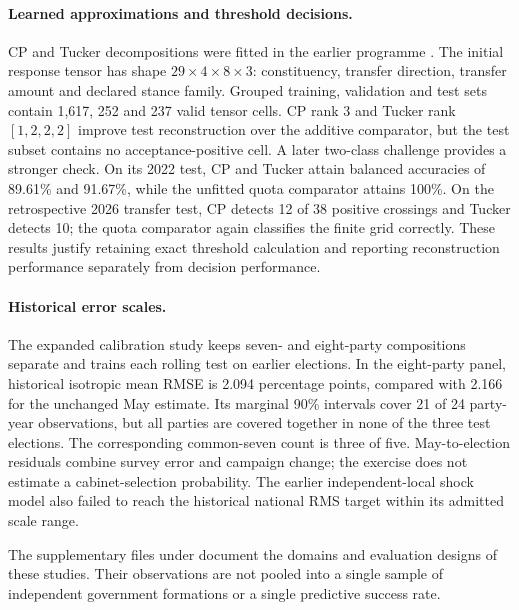\paragraph{Learned approximations and threshold decisions.}
CP and Tucker decompositions were fitted in the earlier programme \citep{kolda2009}. The initial response tensor has shape \(29\times4\times8\times3\): constituency, transfer direction, transfer amount and declared stance family. Grouped training, validation and test sets contain 1,617, 252 and 237 valid tensor cells. CP rank 3 and Tucker rank \([1,2,2,2]\) improve test reconstruction over the additive comparator, but the test subset contains no acceptance-positive cell. A later two-class challenge provides a stronger check. On its 2022 test, CP and Tucker attain balanced accuracies of 89.61\% and 91.67\%, while the unfitted quota comparator attains 100\%. On the retrospective 2026 transfer test, CP detects 12 of 38 positive crossings and Tucker detects 10; the quota comparator again classifies the finite grid correctly. These results justify retaining exact threshold calculation and reporting reconstruction performance separately from decision performance.

\paragraph{Historical error scales.}
The expanded calibration study keeps seven- and eight-party compositions separate and trains each rolling test on earlier elections. In the eight-party panel, historical isotropic mean RMSE is 2.094 percentage points, compared with 2.166 for the unchanged May estimate. Its marginal 90\% intervals cover 21 of 24 party-year observations, but all parties are covered together in none of the three test elections. The corresponding common-seven count is three of five. May-to-election residuals combine survey error and campaign change; the exercise does not estimate a cabinet-selection probability. The earlier independent-local shock model also failed to reach the historical national RMS target within its admitted scale range.

The supplementary files under  document the domains and evaluation designs of these studies. Their observations are not pooled into a single sample of independent government formations or a single predictive success rate.
